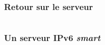 \begin{frame}[fragile]{}
	\frametitle{Retour sur le serveur}
    \begin{minipage}{0.5\textwidth}
      \inputminted[mathescape,
        fontsize=\tiny,
        framesep=2mm]{diff}{../echo_server_v6_naif_v6.diff}
    \end{minipage}
\end{frame}


\begin{frame}[fragile]{}
	\frametitle{Un serveur IPv6 \emph{smart}}
    \begin{minipage}{\textwidth}
      \inputminted[mathescape,
        linenos,
        fontsize=\tiny,
        framesep=2mm]{python}{../echo_server_v6.py}
    \end{minipage}
\end{frame}


